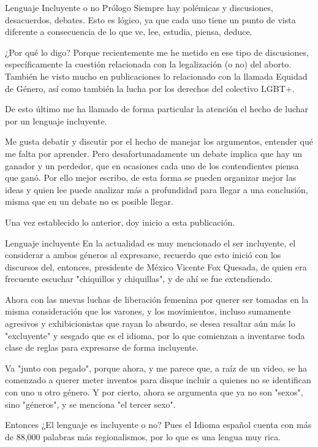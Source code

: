 Lenguaje Incluyente o no
Prólogo
Siempre hay polémicas y discusiones, desacuerdos, debates. Esto es lógico, ya que cada uno tiene un punto de vista diferente a consecuencia de lo que ve, lee, estudia, piensa, deduce.

¿Por qué lo digo? Porque recientemente me he metido en ese tipo de discusiones, específicamente la cuestión relacionada con la legalización (o no) del aborto. También he visto mucho en publicaciones lo relacionado con la llamada Equidad de Género, así como también la lucha por los derechos del colectivo LGBT+.

De esto último me ha llamado de forma particular la atención el hecho de luchar por un lenguaje incluyente.

Me gusta debatir y discutir por el hecho de manejar los argumentos, entender qué me falta por aprender. Pero desafortunadamente un debate implica que hay un ganador y un perdedor, que en ocasiones cada uno de los contendientes piensa que ganó. Por ello mejor escribo, de esta forma se pueden organizar mejor las ideas y quien lee puede analizar más a profundidad para llegar a una conclusión, misma que en un debate no es posible llegar.

Una vez establecido lo anterior, doy inicio a esta publicación.

Lenguaje incluyente
En la actualidad es muy mencionado el ser incluyente, el considerar a ambos géneros al expresarse, recuerdo que esto inició con los discursos del, entonces, presidente de México Vicente Fox Quesada, de quien era frecuente escuchar "chiquillos y chiquillas", y de ahí se fue extendiendo.

Ahora con las nuevas luchas de liberación femenina por querer ser tomadas en la misma consideración que los varones, y los movimientos, incluso sumamente agresivos y exhibicionistas que rayan lo absurdo, se desea resaltar aún más lo "excluyente" y sesgado que es el idioma, por lo que comienzan a inventarse toda clase de reglas para expresarse de forma incluyente.

Va "junto con pegado", porque ahora, y me parece que, a raíz de un video, se ha comenzado a querer meter inventos para disque incluir a quienes no se identifican con uno u otro género. Y por cierto, ahora se argumenta que ya no son "sexos", sino "géneros", y se menciona "el tercer sexo".

Entonces ¿El lenguaje es incluyente o no? Pues el Idioma español cuenta con más de 88,000 palabras más regionalismos, por lo que es una lengua muy rica.

